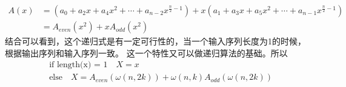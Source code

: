         \begin{equation}
            \begin{split}
                A(x) &= (a_0 + a_2 x + a_4 x^2 + \cdots + a_{n - 2}x^{\frac n 2 - 1}) + x(a_1 + a_3 x + a_5 x^2 + \cdots + a_{n - 1}x^{\frac n 2 - 1})\\
                &= A_{even}(x^2) + xA_{odd}(x^2)
            \end{split} 
            \label{eq: 4.9}
        \end{equation}
        结合可以看到，这个递归式是有一定可行性的，当一个输入序列长度为1的时候，根据输出序列和输入序列一致。%
        这一个特性又可以做递归算法的基础。所以
        \begin{equation*}
            \begin{split}
                &\text{if length(x) = 1}\quad X = x\\
                &\text{else}\quad X = A_{even}(\omega(n, 2k)) + \omega(n, k)A_{odd}(\omega(n, 2k))
            \end{split}
        \end{equation*}
